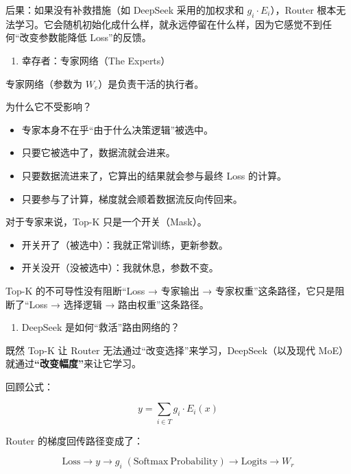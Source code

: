 后果：如果没有补救措施（如 DeepSeek 采用的加权求和 \(g_i \cdot E_i\)），Router 根本无法学习。它会随机初始化成什么样，就永远停留在什么样，因为它感觉不到任何``改变参数能降低 Loss''的反馈。

\begin{enumerate}
\def\labelenumi{\arabic{enumi}.}
\setcounter{enumi}{1}
\tightlist
\item
  幸存者：专家网络（The Experts）
\end{enumerate}

专家网络（参数为 \(W_e\)）是负责干活的执行者。

为什么它不受影响？

\begin{itemize}
\tightlist
\item
  专家本身不在乎``由于什么决策逻辑''被选中。
\item
  只要它被选中了，数据流就会进来。
\item
  只要数据流进来了，它算出的结果就会参与最终 Loss 的计算。
\item
  只要参与了计算，梯度就会顺着数据流反向传回来。
\end{itemize}

对于专家来说，Top-K 只是一个开关（Mask）。

\begin{itemize}
\tightlist
\item
  开关开了（被选中）：我就正常训练，更新参数。
\item
  开关没开（没被选中）：我就休息，参数不变。
\end{itemize}

Top-K 的不可导性没有阻断``Loss → 专家输出 → 专家权重''这条路径，它只是阻断了``Loss → 选择逻辑 → 路由权重''这条路径。

\begin{enumerate}
\def\labelenumi{\arabic{enumi}.}
\setcounter{enumi}{2}
\tightlist
\item
  DeepSeek 是如何``救活''路由网络的？
\end{enumerate}

既然 Top-K 让 Router 无法通过``改变选择''来学习，DeepSeek（以及现代 MoE）就通过\textbf{``改变幅度''}来让它学习。

回顾公式：

\[
y=\sum_{i\in T}g_i\cdot E_i(x)
\]

Router 的梯度回传路径变成了：

\[
\mathrm{Loss}\rightarrow y\rightarrow g_i\;(\mathrm{Softmax\ Probability})\rightarrow \mathrm{Logits}\rightarrow W_r
\]

